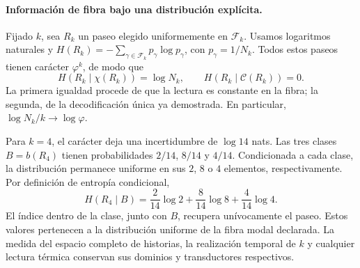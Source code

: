 \paragraph{Información de fibra bajo una distribución explícita.}
Fijado \(k\), sea \(R_k\) un paseo elegido uniformemente en
\(\mathcal F_k\). Usamos logaritmos naturales y
\(H(R_k)=-\sum_{\gamma\in\mathcal F_k}p_\gamma\log p_\gamma\),
con \(p_\gamma=1/N_k\). Todos estos paseos tienen carácter
\(\varphi^k\), de modo que
\[
 H(R_k\mid\chi(R_k))=\log N_k,\qquad
 H(R_k\mid\mathcal C(R_k))=0.
\]
La primera igualdad procede de que la lectura es constante en la
fibra; la segunda, de la decodificación única ya demostrada.
En particular, \(\log N_k/k\to\log\varphi\).

Para \(k=4\), el carácter deja una incertidumbre de \(\log14\)
nats. Las tres clases \(B=b(R_4)\) tienen probabilidades
\(2/14\), \(8/14\) y \(4/14\). Condicionada a cada clase, la
distribución permanece uniforme en sus \(2\), \(8\) o \(4\)
elementos, respectivamente. Por definición de entropía
condicional,
\[
 H(R_4\mid B)
 =\frac2{14}\log2+\frac8{14}\log8+\frac4{14}\log4.
\]
El índice dentro de la clase, junto con \(B\), recupera unívocamente
el paseo. Estos valores pertenecen a la distribución uniforme
de la fibra modal declarada. La medida del espacio completo de
historias, la realización temporal de \(k\) y cualquier lectura
térmica conservan sus dominios y transductores respectivos.
